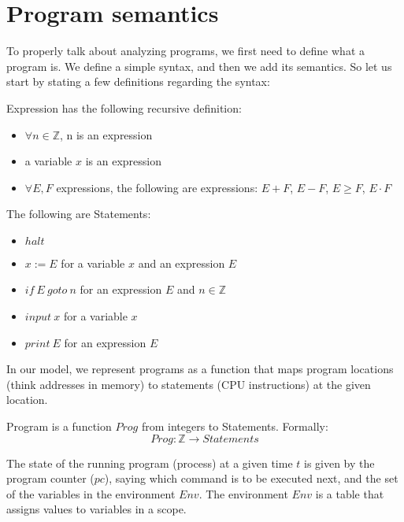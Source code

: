 \section{Program semantics}

To properly talk about analyzing programs, we first need to define what a program is.
We define a simple syntax, and then we add its semantics.
So let us start by stating a few definitions regarding the syntax:

\begin{defn}[Expression]
    Expression has the following recursive definition:
    \begin{itemize}
        \item $\forall n \in \mathbb{Z}$, n is an expression
        \item a variable $x$ is an expression
        \item $\forall E, F$ expressions, the following are expressions: $E+F$, $E-F$, $E \geq F$, $E \cdot F$
    \end{itemize}
\end{defn}

\begin{defn}[Statement]
    The following are Statements:
    \begin{itemize}
        \item $halt$
        \item $x := E$ for a variable $x$ and an expression $E$
        \item $if \: E \: goto \: n$ for an expression $E$ and $n \in \mathbb{Z}$
        \item $input \: x$ for a variable $x$
        \item $print \: E$ for an expression $E$
    \end{itemize}
\end{defn}

In our model, we represent programs as a function that maps program locations (think addresses in memory) to statements
(CPU instructions) at the given location.

\begin{defn}[Program]
    Program is a function $Prog$ from integers to Statements.
    Formally:
    \[Prog: \mathbb{Z} \rightarrow Statements\]
\end{defn}

The state of the running program (process) at a given time $t$ is given by the program counter ($pc$), saying which
command is to be executed next, and the set of the variables in the environment $Env$.
The environment $Env$ is a table that assigns values to variables in a scope.

